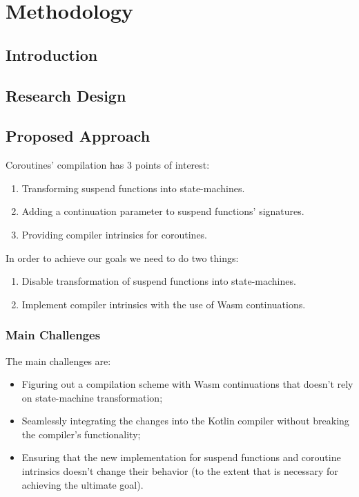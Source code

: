 \chapter{Methodology}
\label{ch:methodology}

\section{Introduction}
\label{sec:methodology-intro}

\section{Research Design}
\label{sec:research-design}

\section{Proposed Approach}
\label{sec:approach}

Coroutines' compilation has 3 points of interest:

\begin{enumerate}
    \item Transforming suspend functions into state-machines.
    \item Adding a continuation parameter to suspend functions' signatures.
    \item Providing compiler intrinsics for coroutines.
\end{enumerate}

In order to achieve our goals we need to do two things:

\begin{enumerate}
    \item Disable transformation of suspend functions into state-machines.
    \item Implement compiler intrinsics with the use of Wasm continuations.
\end{enumerate}

\subsection{Main Challenges}
\label{subsec:challenges}

The main challenges are:

\begin{itemize}
    \item Figuring out a compilation scheme with Wasm continuations that doesn't rely on state-machine transformation;
    \item Seamlessly integrating the changes into the Kotlin compiler without breaking the compiler's functionality;
    \item Ensuring that the new implementation for suspend functions and coroutine intrinsics doesn't change their behavior (to the extent that is necessary for achieving the ultimate goal).
\end{itemize}


